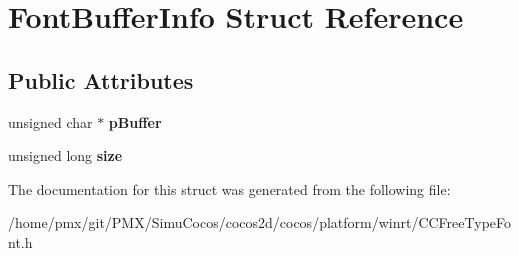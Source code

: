 \hypertarget{structFontBufferInfo}{}\section{Font\+Buffer\+Info Struct Reference}
\label{structFontBufferInfo}
\subsection*{Public Attributes}
\begin{DoxyCompactItemize}
\item 
\mbox{\label{structFontBufferInfo_aee82e89d02ec1e89c7109ea7a3b3b43d}} 
unsigned char $\ast$ {\bfseries p\+Buffer}
\item 
\mbox{\label{structFontBufferInfo_a6c893c31740cd1216f6bebfa973d737f}} 
unsigned long {\bfseries size}
\end{DoxyCompactItemize}


The documentation for this struct was generated from the following file\+:\begin{DoxyCompactItemize}
\item 
/home/pmx/git/\+P\+M\+X/\+Simu\+Cocos/cocos2d/cocos/platform/winrt/C\+C\+Free\+Type\+Font.\+h\end{DoxyCompactItemize}
